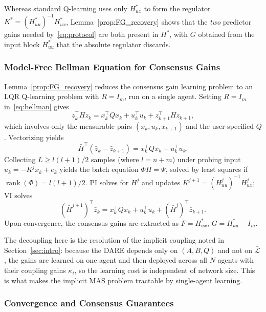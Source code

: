 \documentclass[12pt]{elsarticle}
\theoremstyle{remark}
\DeclareMathOperator{\rank}{rank}
\begin{document}
Whereas standard Q-learning uses only $H_{ux}^*$ to form the regulator $K^*=(H_{uu}^*)^{-1}H_{ux}^*$, Lemma~\ref{prop:FG_recovery} shows that the \emph{two} predictor gains needed by~\eqref{eq:protocol} are both present in $H^*$, with $G$ obtained from the input block $H_{uu}^*$ that the absolute regulator discards.

\subsubsection{Model-Free Bellman Equation for Consensus Gains}
\label{subsec:sf_bellman}

Lemma~\ref{prop:FG_recovery} reduces the consensus gain learning problem to an LQR Q-learning problem with $R = I_m$, run on a single agent. Setting $R = I_m$ in~\eqref{eq:bellman} gives
\begin{equation}
z_k^\top H z_k = x_k^\top Q x_k + u_k^\top u_k + z_{k+1}^\top H z_{k+1},
\label{eq:bellman_consensus}
\end{equation}
which involves only the measurable pairs $(x_k, u_k, x_{k+1})$ and the user-specified $Q$. Vectorizing yields
\begin{equation}
\bar{H}^\top (\bar{z}_k - \bar{z}_{k+1}) = x_k^\top Q x_k + u_k^\top u_k.
\label{eq:bellman_vec}
\end{equation}
Collecting $L \geq l(l+1)/2$ samples (where $l = n + m$) under probing input $u_k = -K^j x_k + e_k$ yields the batch equation $\Phi \bar{H} = \Psi$, solved by least squares if $\rank(\Phi) = l(l+1)/2$. PI solves for $H^j$ and updates $K^{j+1} = (H_{uu}^j)^{-1} H_{ux}^j$; VI solves
\begin{equation}
(\bar{H}^{j+1})^\top \bar{z}_k = x_k^\top Q x_k + u_k^\top u_k + (\bar{H}^j)^\top \bar{z}_{k+1}.
\label{eq:vi_update}
\end{equation}
Upon convergence, the consensus gains are extracted as $F = H_{ux}^*$, $G = H_{uu}^* - I_m$.

The decoupling here is the resolution of the implicit coupling noted in Section~\ref{sec:intro}: because the DARE depends only on $(A,B,Q)$ and not on $\bar{\mathcal{L}}$, the gains are learned on one agent and then deployed across all $N$ agents with their coupling gains $\kappa_i$, so the learning cost is independent of network size. This is what makes the implicit MAS problem tractable by single-agent learning.

\subsubsection{Convergence and Consensus Guarantees}
\label{subsec:sf_convergence}
\end{document}
